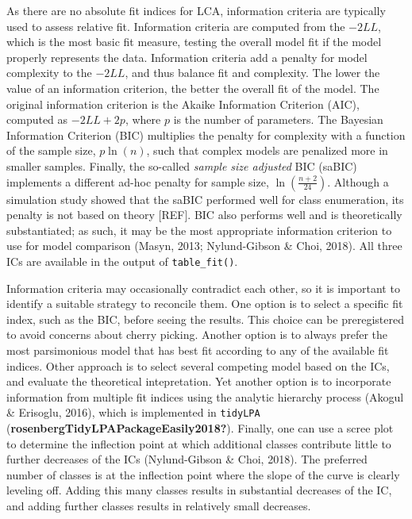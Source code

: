 \documentclass[
  ,man,floatsintext]{apa6}
\begin{document}
As there are no absolute fit indices for LCA, information criteria are
typically used to assess relative fit. Information criteria are computed
from the \(-2LL\), which is the most basic fit measure, testing the
overall model fit if the model properly represents the data. Information
criteria add a penalty for model complexity to the \(-2LL\), and thus
balance fit and complexity. The lower the value of an information
criterion, the better the overall fit of the model. The original
information criterion is the Akaike Information Criterion (AIC),
computed as \(-2LL+2p\), where \(p\) is the number of parameters. The
Bayesian Information Criterion (BIC) multiplies the penalty for
complexity with a function of the sample size, \(p \ln(n)\), such that
complex models are penalized more in smaller samples. Finally, the
so-called \emph{sample size adjusted} BIC (saBIC) implements a different
ad-hoc penalty for sample size, \(\ln(\frac{n + 2}{24})\). Although a
simulation study showed that the saBIC performed well for class
enumeration, its penalty is not based on theory {[}REF{]}. BIC also performs
well and is theoretically substantiated; as such, it may be the most
appropriate information criterion to use for model comparison
(Masyn, 2013; Nylund-Gibson \& Choi, 2018). All three ICs are
available in the output of \texttt{table\_fit()}.

Information criteria may occasionally contradict each other, so it is
important to identify a suitable strategy to reconcile them. One option
is to select a specific fit index, such as the BIC, before seeing the
results. This choice can be preregistered to avoid concerns about cherry
picking. Another option is to always prefer the most parsimonious model
that has best fit according to any of the available fit indices. Other
approach is to select several competing model based on the ICs, and
evaluate the theoretical intepretation. Yet another option is to
incorporate information from multiple fit indices using the analytic
hierarchy process (Akogul \& Erisoglu, 2016), which is implemented in
\texttt{tidyLPA} (\textbf{rosenbergTidyLPAPackageEasily2018?}). Finally, one can use a
scree plot to determine the inflection point at which additional classes
contribute little to further decreases of the ICs
(Nylund-Gibson \& Choi, 2018). The preferred number of classes is at the
inflection point where the slope of the curve is clearly leveling off.
Adding this many classes results in substantial decreases of the IC, and
adding further classes results in relatively small decreases.
\end{document}
